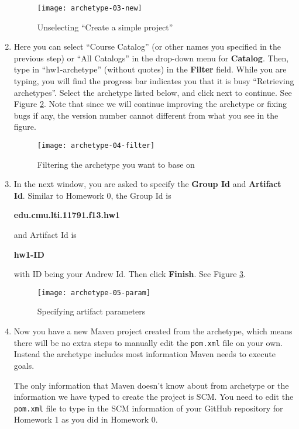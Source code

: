 \begin{enumerate}
\begin{figure}[t]
\centering
\texttt{[image: archetype-03-new]}
\caption{Unselecting ``Create a simple project''\label{fig:archetype-03-new}}
\end{figure}

\item Here you can select ``Course Catalog'' (or other names you specified in
the previous step) or ``All Catalogs'' in the drop-down menu for
\textbf{Catalog}. Then, type in ``hw1-archetype'' (without quotes) in the \textbf{Filter}
field. While you are typing, you will find the progress bar indicates you that
it is busy ``Retrieving archetypes''. Select the archetype listed below, and
click next to continue. See Figure \ref{fig:archetype-04-filter}. Note that
since we will continue improving the archetype or fixing bugs if any, the
version number cannot different from what you see in the figure.

\begin{figure}[t]
\centering
\texttt{[image: archetype-04-filter]}
\caption{Filtering the archetype you want to base on\label{fig:archetype-04-filter}}
\end{figure}

\item In the next window, you are asked to specify the \textbf{Group Id} and
\textbf{Artifact Id}. Similar to Homework 0, the Group Id is

\begin{center}
\textbf{edu.cmu.lti.11791.f13.hw1}
\end{center}

and Artifact Id is

\begin{center}
\textbf{hw1-ID}
\end{center}

with ID being your Andrew Id. Then click \textbf{Finish}. See Figure
\ref{fig:archetype-05-param}.

\begin{figure}[t]
\centering
\texttt{[image: archetype-05-param]}
\caption{Specifying artifact parameters\label{fig:archetype-05-param}}
\end{figure}

\item Now you have a new Maven project created from the archetype, which means
there will be no extra steps to manually edit the \verb|pom.xml| file on your
own. Instead the archetype includes most information Maven needs to execute
goals.

The only information that Maven doesn't know about from archetype or the
information we have typed to create the project is SCM. You need to edit the
\texttt{pom.xml} file to type in the SCM information of your GitHub repository
for Homework 1 as you did in Homework 0.

\end{enumerate}


